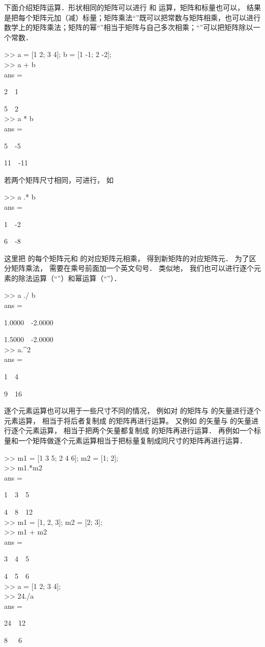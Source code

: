 下面介绍矩阵运算．形状相同的矩阵可以进行 \x{+} 和 \x{-} 运算，矩阵和标量也可以， 结果是把每个矩阵元加（减）标量；矩阵乘法“\x{*}”既可以把常数与矩阵相乘，也可以进行数学上的矩阵乘法；矩阵的幂“\x{\^{}}”相当于矩阵与自己多次相乘；“\x{/}”可以把矩阵除以一个常数．
\begin{Command}
>> a = [1 2; 3 4]; b = [1 -1; 2 -2]; \\
>> a + b \\
ans = \par
2\ \ 1 \par
5\ \ 2\\
>> a * b \\
ans = \par
5\ \ -5 \par
11\ \ -11
\end{Command}
若两个矩阵尺寸相同，可进行， 如
\begin{Command}
>> a .* b \\
ans = \par
1\ \ -2 \par
6\ \ -8
\end{Command}
这里把  的每个矩阵元和  的对应矩阵元相乘， 得到新矩阵的对应矩阵元． 为了区分矩阵乘法， 需要在乘号前面加一个英文句号． 类似地， 我们也可以进行逐个元素的除法运算（“”）和幂运算（“”）．
\begin{Command}
>> a ./ b \\
ans = \par
1.0000\ \ -2.0000 \par
1.5000\ \ -2.0000\\
>> a.\^{}2 \\
ans = \par
1\ \ 4 \par
9\ \ 16
\end{Command}

逐个元素运算也可以用于一些尺寸不同的情况， 例如对  的矩阵与  的矢量进行逐个元素运算， 相当于将后者复制成  的矩阵再进行运算。 又例如  的矢量与  的矢量进行逐个元素运算， 相当于把两个矢量都复制成  的矩阵再进行运算． 再例如一个标量和一个矩阵做逐个元素运算相当于把标量复制成同尺寸的矩阵再进行运算．

\begin{Command}
>> m1 = [1 3 5; 2 4 6]; m2 = [1; 2]; \\
>>  m1.*m2 \\
ans = \par
1\ \ 3\ \ 5 \par
4\ \ 8\ \ 12 \\
>> m1 = [1, 2, 3]; m2 = [2; 3]; \\
>> m1 + m2 \\
ans = \par
3\ \ 4\ \ 5 \par
4\ \ 5\ \ 6 \\
>> a = [1 2; 3 4];\\
>> 24./a\\
ans = \par
24\ \ 12\par
8\ \ \ 6\\
\end{Command}

